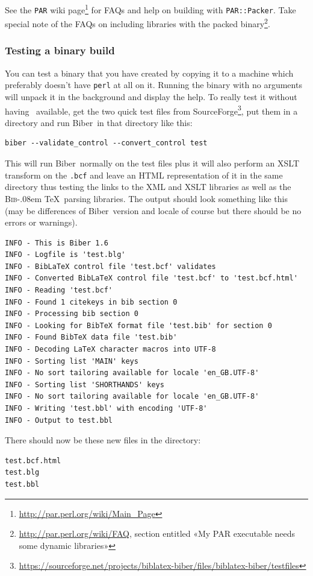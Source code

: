 \documentclass{ltxdockit}
\def\BibTeX{\textsc{Bib}\kern-.08em \TeX}
\newcommand*{\biber}{Biber\xspace}
\begin{document}
See the \verb+PAR+ wiki
page\footnote{\url{http://par.perl.org/wiki/Main_Page}} for FAQs and help
on building with \verb+PAR::Packer+. Take special note of the FAQs on
including libraries with the packed
binary\footnote{\url{http://par.perl.org/wiki/FAQ}, section entitled «My
  PAR executable needs some dynamic libraries»}.

\subsubsection{Testing a binary build}
You can test a binary that you have created by copying it to a machine
which preferably doesn't have \verb+perl+ at all on it. Running the binary with no
arguments will unpack it in the background and display the help. To really
test it without having \latex\ available, get the two quick test files from
SourceForge\footnote{\url{https://sourceforge.net/projects/biblatex-biber/files/biblatex-biber/testfiles}},
put them in a directory and run \biber\ in that directory like this:

\begin{verbatim}
biber --validate_control --convert_control test
\end{verbatim}

\noindent This will run \biber\ normally on the test files plus it
will also perform an XSLT transform on the \verb+.bcf+ and
leave an HTML representation of it in the same directory thus testing the
links to the XML and XSLT libraries as well as the \BibTeX\ parsing
libraries. The output should look something like this (may be differences
of \biber\ version and locale of course but there should be no errors
or warnings).

\begin{verbatim}
INFO - This is Biber 1.6
INFO - Logfile is 'test.blg'
INFO - BibLaTeX control file 'test.bcf' validates
INFO - Converted BibLaTeX control file 'test.bcf' to 'test.bcf.html'
INFO - Reading 'test.bcf'
INFO - Found 1 citekeys in bib section 0
INFO - Processing bib section 0
INFO - Looking for BibTeX format file 'test.bib' for section 0
INFO - Found BibTeX data file 'test.bib'
INFO - Decoding LaTeX character macros into UTF-8
INFO - Sorting list 'MAIN' keys
INFO - No sort tailoring available for locale 'en_GB.UTF-8'
INFO - Sorting list 'SHORTHANDS' keys
INFO - No sort tailoring available for locale 'en_GB.UTF-8'
INFO - Writing 'test.bbl' with encoding 'UTF-8'
INFO - Output to test.bbl
\end{verbatim}

\noindent There should now be these new files in the directory:

\begin{verbatim}
test.bcf.html
test.blg
test.bbl
\end{verbatim}
\end{document}
